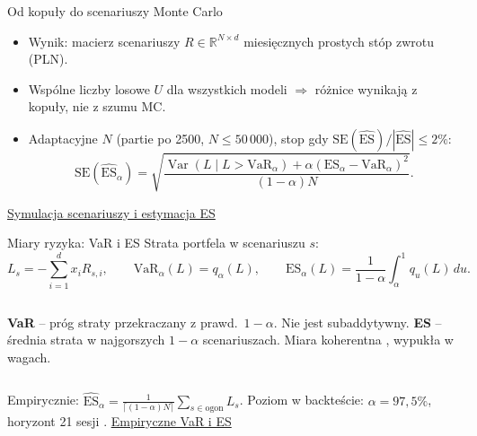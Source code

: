 \documentclass[aspectratio=169,11pt]{beamer}
\newcommand{\repo}{https://github.com/michalmarchwiak/bsc-project}
\newcommand{\rev}{9e941db56fde866672b262f5f6725268ce58feb7}
\newcommand{\src}[2]{\vfill{\scriptsize\color{Teal}%
  \href{\repo/blob/\rev/#1}{#2}}}
\begin{document}
\begin{frame}{Od kopuły do scenariuszy Monte Carlo}
  \centering
  \raggedright\medskip
  \begin{itemize}
    \item Wynik: macierz scenariuszy \(R\in\mathbb{R}^{N\times d}\)
      miesięcznych prostych stóp zwrotu (PLN).
    \item Wspólne liczby losowe \(U\) dla wszystkich modeli
      \(\Rightarrow\) różnice wynikają z kopuły, nie z szumu MC.
    \item Adaptacyjne \(N\) (partie po 2500, \(N\le 50\,000\)), stop gdy
      \(\mathrm{SE}(\widehat{\mathrm{ES}})/|\widehat{\mathrm{ES}}|\le 2\%\):
      \[
        \mathrm{SE}(\widehat{\mathrm{ES}}_\alpha)=
        \sqrt{\frac{\operatorname{Var}(L\mid L>\mathrm{VaR}_\alpha)
          +\alpha(\mathrm{ES}_\alpha-\mathrm{VaR}_\alpha)^2}{(1-\alpha)N}}.
      \]
  \end{itemize}
  \src{src/pf/sim/scenarios.py}{Symulacja scenariuszy i estymacja ES}
\end{frame}

\begin{frame}{Miary ryzyka: VaR i ES}
  Strata portfela w scenariuszu \(s\):
  \[
    L_s=-\sum_{i=1}^d x_i R_{s,i},
    \qquad
    \mathrm{VaR}_\alpha(L)=q_\alpha(L),
    \qquad
    \mathrm{ES}_\alpha(L)=\frac{1}{1-\alpha}\int_\alpha^1 q_u(L)\,du .
  \]
  \begin{columns}[T,onlytextwidth]
    \textbf{VaR} -- próg straty przekraczany z prawd.\ \(1-\alpha\).
    Nie jest subaddytywny.
    \textbf{ES} -- średnia strata w najgorszych \(1-\alpha\)
    scenariuszach. Miara koherentna \citep{artzner1999,acerbi2002},
    wypukła w wagach.
  \end{columns}
  \medskip
  Empirycznie:
  \(\widehat{\mathrm{ES}}_\alpha=\frac{1}{\lceil(1-\alpha)N\rceil}
  \sum_{s\in\text{ogon}}L_s\).
  Poziom w backteście: \(\alpha=97{,}5\%\), horyzont 21 sesji
  \citep[rozdz.~2]{mcneil2005}.
  \src{src/pf/opt/cvar.py}{Empiryczne VaR i ES}
\end{frame}
\end{document}
